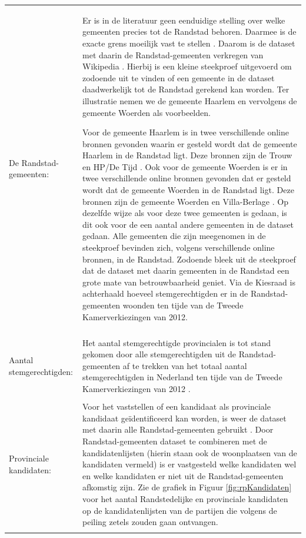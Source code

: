 \noindent\begin{tabularx}{\textwidth}{LI}
De Randstad-gemeenten: &  Er is in de literatuur geen eenduidige stelling over welke gemeenten precies tot de Randstad behoren. Daarmee is de exacte grens moeilijk vast te stellen \citep{nijmeijer2000randstad}. Daarom is de dataset met daarin de Randstad-gemeenten verkregen van Wikipedia \citeyearpar{randstad}. Hierbij is een kleine steekproef uitgevoerd om zodoende uit te vinden of een gemeente in de dataset daadwerkelijk tot de Randstad gerekend kan worden. Ter illustratie nemen we de gemeente Haarlem en vervolgens de gemeente Woerden als voorbeelden. 

\hspace*{1em} Voor de gemeente Haarlem is in twee verschillende online bronnen gevonden waarin er gesteld wordt dat de gemeente Haarlem in de Randstad ligt. Deze bronnen zijn de Trouw \citeyearpar{trouwhaarlem} en HP/De Tijd \citeyearpar{HPhaarlem}. Ook voor de gemeente Woerden is er in twee verschillende online bronnen gevonden dat er gesteld wordt dat de gemeente Woerden in de Randstad ligt. Deze bronnen zijn de gemeente Woerden \citeyearpar{gemeentewoerden} en Villa-Berlage \citeyearpar{villaberlage}. Op dezelfde wijze als voor deze twee gemeenten is gedaan, is dit ook voor de een aantal andere gemeenten in de dataset gedaan. Alle gemeenten die zijn meegenomen in de steekproef bevinden zich, volgens verschillende online bronnen, in de Randstad. Zodoende bleek uit de steekproef dat de dataset met daarin gemeenten in de Randstad een grote mate van betrouwbaarheid geniet. Via de Kiesraad \citeyearpar{Kiesraad_databank} is achterhaald hoeveel stemgerechtigden er in de Randstad-gemeenten woonden ten tijde van de Tweede Kamerverkiezingen van 2012.  \\
\\  
Aantal stemgerechtigden:  & Het aantal stemgerechtigde provincialen is tot stand gekomen door alle stemgerechtigden uit de Randstad-gemeenten \citep{randstad} af te trekken van het totaal aantal stemgerechtigden in Nederland ten tijde van de Tweede Kamerverkiezingen van 2012 \citep{Kiesraad_uitslag}.   \\
\\
Provinciale kandidaten: &  Voor het vaststellen of een kandidaat als provinciale kandidaat geïdentificeerd kan worden, is weer de dataset met daarin alle Randstad-gemeenten gebruikt \citep{randstad}. Door Randstad-gemeenten dataset te combineren met de kandidatenlijsten (hierin staan ook de woonplaatsen van de kandidaten vermeld) is er vastgesteld welke kandidaten wel en welke kandidaten er niet uit de Randstad-gemeenten afkomstig zijn.  Zie de grafiek in Figuur \ref{fig:rpKandidaten} voor het aantal Randstedelijke en provinciale kandidaten op de kandidatenlijsten van de partijen die volgens de peiling zetels zouden gaan ontvangen.\\
\\
 \end{tabularx}


